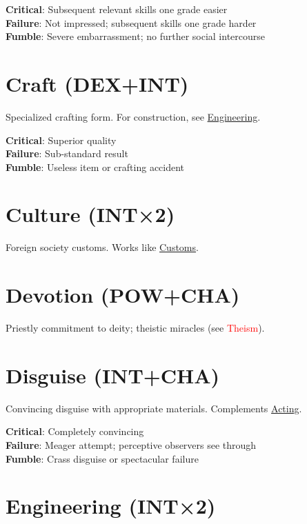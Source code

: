 \documentclass[10pt]{article}
\begin{document}
\textbf{Critical}: Subsequent relevant skills one grade easier\\
\textbf{Failure}: Not impressed; subsequent skills one grade harder\\
\textbf{Fumble}: Severe embarrassment; no further social intercourse

\section{Craft (DEX+INT)}
\label{skill:craft}

Specialized crafting form. For construction, see \hyperref[skill:engineering]{Engineering}.

\textbf{Critical}: Superior quality\\
\textbf{Failure}: Sub-standard result\\
\textbf{Fumble}: Useless item or crafting accident

\section{Culture (INT×2)}
\label{skill:culture}

Foreign society customs. Works like \hyperref[skill:customs]{Customs}.

\section{Devotion (POW+CHA)}
\label{skill:devotion}

Priestly commitment to deity; theistic miracles (see \textcolor{red}{Theism}).

\section{Disguise (INT+CHA)}
\label{skill:disguise}

Convincing disguise with appropriate materials. Complements \hyperref[skill:acting]{Acting}.

\textbf{Critical}: Completely convincing\\
\textbf{Failure}: Meager attempt; perceptive observers see through\\
\textbf{Fumble}: Crass disguise or spectacular failure

\section{Engineering (INT×2)}
\label{skill:engineering}
\end{document}
